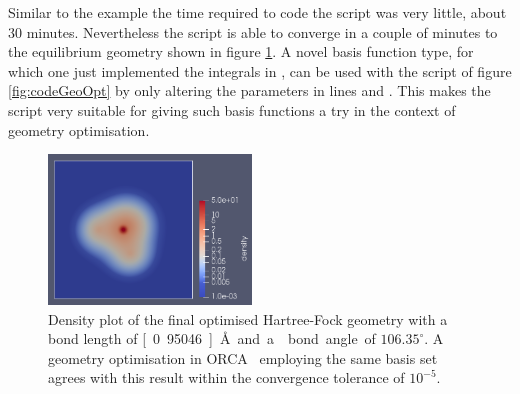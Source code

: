 Similar to the \CCD example the time required to code the script
was very little, about 30 minutes.
Nevertheless the script is able to converge
in a couple of minutes to the equilibrium geometry shown
in figure \ref{fig:OptimalGeometryWater}.
A novel basis function type,
for which one just implemented the \SCF integrals in \gint,
can be used with the script of figure \ref{fig:codeGeoOpt}
by only altering the parameters in lines \lgbasone and \lgbastwo.
This makes the script very suitable for giving such basis functions
a try in the context of geometry optimisation.

\begin{figure}
	\centering
	\includegraphics[width=0.48\textwidth]{h2o_density.png}
	\caption[Density plot of an optimised  molecule at Hartree-Fock level]
	{Density plot of the final optimised 
	Hartree-Fock geometry with a
	 bond length of \unit[0.95046]{\AA} and
	a  bond angle of $106.35^\circ$.
	A geometry optimisation in ORCA~\cite{ORCA}
	employing the same basis set
	agrees with this result within the convergence tolerance of $10^{-5}$.
	}
	\label{fig:OptimalGeometryWater}
\end{figure}
